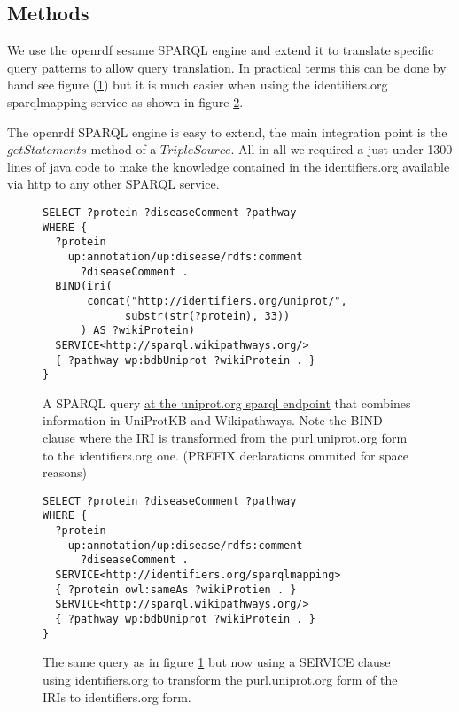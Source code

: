 \documentclass{bioinfo}
\begin{document}
\begin{methods}
\section{Methods}

We use the openrdf sesame SPARQL engine\cite{OpenRdfSesame} and extend it to translate specific query patterns to allow query translation.
In practical terms this can be done by hand see figure (\ref{stringstuff}) but it is much easier when using the identifiers.org sparqlmapping service as shown in figure \ref{translatestuff}.

The openrdf SPARQL engine is easy to extend, the main integration point is the $getStatements$ method of a $TripleSource$.
All in all we required a just under 1300 lines of java code to make the knowledge contained in the identifiers.org available via http to any other SPARQL service.


\begin{figure}
\begin{verbatim}
SELECT ?protein ?diseaseComment ?pathway
WHERE {
  ?protein 
    up:annotation/up:disease/rdfs:comment 
      ?diseaseComment .
  BIND(iri(
       concat("http://identifiers.org/uniprot/", 
             substr(str(?protein), 33))
      ) AS ?wikiProtein)
  SERVICE<http://sparql.wikipathways.org/>
  { ?pathway wp:bdbUniprot ?wikiProtein . }
}
\end{verbatim}
  \caption{A SPARQL query \href{http://beta.sparql.uniprot.org/sparql}{at the uniprot.org sparql endpoint} that combines information
  in UniProtKB and Wikipathways. Note the BIND clause where the IRI is transformed from the purl.uniprot.org form to the identifiers.org one. (PREFIX declarations ommited for space reasons)}
  \label{stringstuff}
\end{figure}

\begin{figure}
\begin{verbatim}
SELECT ?protein ?diseaseComment ?pathway
WHERE {
  ?protein 
    up:annotation/up:disease/rdfs:comment 
      ?diseaseComment .
  SERVICE<http://identifiers.org/sparqlmapping>
  { ?protein owl:sameAs ?wikiProtien . }
  SERVICE<http://sparql.wikipathways.org/>
  { ?pathway wp:bdbUniprot ?wikiProtein . }
}
\end{verbatim}
  \caption{The same query as in figure \ref{stringstuff} but now using a SERVICE clause using identifiers.org to transform the purl.uniprot.org form of the IRIs to identifiers.org form.}
  \label{translatestuff}
\end{figure} 



\end{methods}
\end{document}
